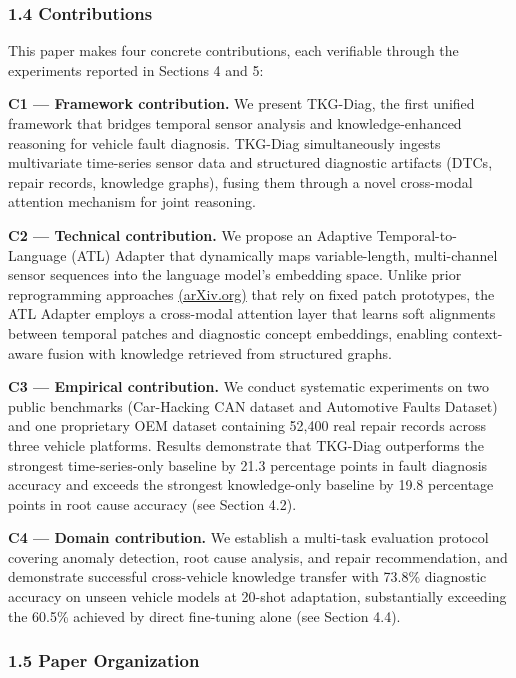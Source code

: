 \documentclass[
  11pt,
]{article}
\begin{document}
\subsubsection{1.4 Contributions}\label{contributions}

This paper makes four concrete contributions, each verifiable through
the experiments reported in Sections 4 and 5:

\textbf{C1 --- Framework contribution.} We present TKG-Diag, the first
unified framework that bridges temporal sensor analysis and
knowledge-enhanced reasoning for vehicle fault diagnosis. TKG-Diag
simultaneously ingests multivariate time-series sensor data and
structured diagnostic artifacts (DTCs, repair records, knowledge
graphs), fusing them through a novel cross-modal attention mechanism for
joint reasoning.

\textbf{C2 --- Technical contribution.} We propose an Adaptive
Temporal-to-Language (ATL) Adapter that dynamically maps
variable-length, multi-channel sensor sequences into the language
model's embedding space. Unlike prior reprogramming approaches
\href{https://arxiv.org/html/2310.01728v1}{(arXiv.org)} that rely on
fixed patch prototypes, the ATL Adapter employs a cross-modal attention
layer that learns soft alignments between temporal patches and
diagnostic concept embeddings, enabling context-aware fusion with
knowledge retrieved from structured graphs.

\textbf{C3 --- Empirical contribution.} We conduct systematic
experiments on two public benchmarks (Car-Hacking CAN dataset and
Automotive Faults Dataset) and one proprietary OEM dataset containing
52,400 real repair records across three vehicle platforms. Results
demonstrate that TKG-Diag outperforms the strongest time-series-only
baseline by 21.3 percentage points in fault diagnosis accuracy and
exceeds the strongest knowledge-only baseline by 19.8 percentage points
in root cause accuracy (see Section 4.2).

\textbf{C4 --- Domain contribution.} We establish a multi-task
evaluation protocol covering anomaly detection, root cause analysis, and
repair recommendation, and demonstrate successful cross-vehicle
knowledge transfer with 73.8\% diagnostic accuracy on unseen vehicle
models at 20-shot adaptation, substantially exceeding the 60.5\%
achieved by direct fine-tuning alone (see Section 4.4).

\subsubsection{1.5 Paper Organization}\label{paper-organization}
\end{document}
